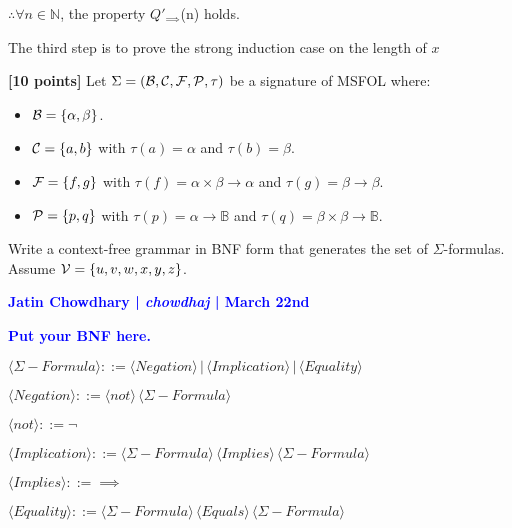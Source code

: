 \documentclass[11pt,fleqn]{article}
\newcommand{\sB}{\mbox{$\cal B$}}
\newcommand{\sC}{\mbox{$\cal C$}}
\newcommand{\sF}{\mbox{$\cal F$}}
\newcommand{\sP}{\mbox{$\cal P$}}
\newcommand{\sV}{\mbox{$\cal V$}}
\newcommand{\set}[1]{{\{ #1 \}}}
\begin{document}
  $\therefore \forall n \in \mathbb{N}$, the property $Q'_{\implies}$(n) holds.

  \bigskip

  The third step is to prove the strong induction case on the length of $x$

  \newpage

  \item \textbf{[10 points]} Let $\Sigma = (\sB,\sC,\sF,\sP,\tau)$ be
    a signature of MSFOL where:

  \begin{itemize}

    \item[] $\sB = \set{\alpha,\beta}$.

    \item[] $\sC = \set{a,b}$ with $\tau(a) = \alpha$ and $\tau(b) = \beta$.

    \item[] $\sF = \set{f,g}$ with $\tau(f) = \alpha \times \beta
      \rightarrow \alpha$ and $\tau(g) = \beta
      \rightarrow \beta$.

    \item[] $\sP = \set{p,q}$ with $\tau(p) = \alpha \rightarrow
      \mathbb{B}$ and $\tau(q) = \beta \times \beta \rightarrow
      \mathbb{B}$.

  \end{itemize}

  Write a context-free grammar in BNF form that generates the set of
  $\Sigma$-formulas.  Assume $\sV = \set{u,v,w,x,y,z}$.

  \bigskip

  \textcolor{blue}{\textbf{Jatin Chowdhary | \textit{chowdhaj} | March 22nd}}

  \textcolor{blue}{\textbf{Put your BNF here.}}

  $\langle\Sigma-Formula \rangle ::= \langle Negation\rangle \,|\, \langle Implication\rangle \, | \, \langle Equality \rangle$

  $\langle Negation \rangle ::= \langle not \rangle \, \langle\Sigma-Formula\rangle$

  $\langle not \rangle ::= \neg$

  $\langle Implication \rangle ::= \langle\Sigma-Formula\rangle \, \langle Implies \rangle \, \langle\Sigma-Formula\rangle$  

  $\langle Implies \rangle ::= \implies$  

  $\langle Equality \rangle ::= \langle\Sigma-Formula\rangle \, \langle Equals \rangle \, \langle\Sigma-Formula\rangle$  
\end{document}
